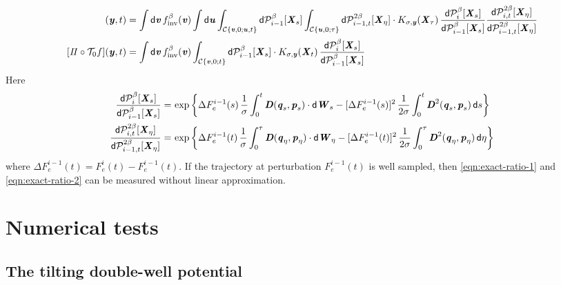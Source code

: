 \documentclass[aip,jcp,a4paper,reprint,onecolumn]{revtex4-1}
\newcommand{\vect}[1]{\textbf{\textit{#1}}}
\newcommand{\dd}{\textsf{d}}
\newcommand{\inv}{\textrm{inv}}
\newcommand{\mt}{\mathcal T}
\newcommand{\mc}{\mathcal C}
\newcommand{\proj}{\mathit\Pi}
\begin{document}
\begin{align}
  [\proj\circ\mt_\tau f](\vect y, t)
  &=
  \int\dd\vect v\,
  f_\inv^\beta(\vect v)
  \int\dd\vect u
  \int_{\mc\{\vect v,0; \vect u,t\}}
  \dd\mathcal P_{i-1}^\beta[\vect X_s]  
  \int_{\mc\{\vect u,0; \tau\}}
  \dd\mathcal P_{i-1,t}^{2\beta}[\vect X_\eta]\cdot
  K_{\sigma,\vect y}(\vect X_\tau)\,
  \frac
  {\dd\mathcal P_{i}^\beta[\vect X_s]}
  {\dd\mathcal P_{i-1}^\beta[\vect X_s]}
  \frac
  {\dd\mathcal P_{i,t}^{2\beta}[\vect X_\eta]}
  {\dd\mathcal P_{i-1,t}^{2\beta}[\vect X_\eta]}
  \\
  [\proj\circ\mt_0 f](\vect y, t)
  &=
  \int\dd\vect v\,
  f_{\inv}^\beta(\vect v)
  \int_{\mc\{\vect v,0; t\}}
  \dd\mathcal P_{i-1}^\beta[\vect X_s]
  \cdot
  K_{\sigma,\vect y}(\vect X_t)\,
  \frac
  {\dd\mathcal P_{i}^\beta[\vect X_s]}
  {\dd\mathcal P_{i-1}^\beta[\vect X_s]}  
\end{align}
Here
\begin{align}\label{eqn:exact-ratio-1}
  \frac
  {\dd\mathcal P_{i}^\beta[\vect X_s]}
  {\dd\mathcal P_{i-1}^\beta[\vect X_s]}  
  =&\,
  \exp
  \bigg\{
  \Delta F_e^{i-1}(s)\,
  \frac{1}\sigma\int_0^t
  \vect D(\vect q_s,\vect p_s)\cdot\dd\vect W_s
  -
  [\Delta F_e^{i-1}(s)]^2\,
  \frac 1{2\sigma}\int_0^t
  \vect D^2(\vect q_s,\vect p_s)\,\dd s
  \bigg\}\\\label{eqn:exact-ratio-2}
  \frac
  {\dd\mathcal P_{i,t}^{2\beta}[\vect X_\eta]}
  {\dd\mathcal P_{i-1,t}^{2\beta}[\vect X_\eta]}
  =&\,
  \exp
  \bigg\{
  \Delta F_e^{i-1}(t)\,
  \frac{1}\sigma\int_0^\tau
  \vect D(\vect q_\eta,\vect p_\eta)\cdot\dd\vect W_\eta
  -
  [\Delta F_e^{i-1}(t)]^2\,
  \frac 1{2\sigma}\int_0^\tau
  \vect D^2(\vect q_\eta,\vect p_\eta)\,\dd \eta
  \bigg\}
\end{align}
where $\Delta F_e^{i-1}(t) = F_e^{i}(t) - F_e^{i-1}(t) $.
If the trajectory at perturbation $ F_e^{i-1}(t) $ is well sampled, then
\eqref{eqn:exact-ratio-1} and \eqref{eqn:exact-ratio-2} can be measured
without linear approximation.

\section{Numerical tests}

\subsection{The tilting double-well potential}
\end{document}

